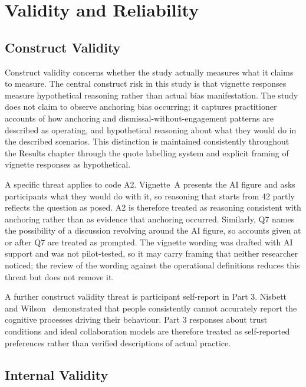 \documentclass[a4paper,twoside]{bth}
\begin{document}
\section{Validity and Reliability}
\label{sec:validity}

\subsection{Construct Validity}

Construct validity concerns whether the study actually measures what it claims to measure. The central construct risk in this study is that vignette responses measure hypothetical reasoning rather than actual bias manifestation. The study does not claim to observe anchoring bias occurring; it captures practitioner accounts of how anchoring and dismissal-without-engagement patterns are described as operating, and hypothetical reasoning about what they would do in the described scenarios. This distinction is maintained consistently throughout the Results chapter through the quote labelling system and explicit framing of vignette responses as hypothetical.

A specific threat applies to code A2. Vignette~A presents the AI figure and asks participants what they would do with it, so reasoning that starts from 42 partly reflects the question as posed. A2 is therefore treated as reasoning consistent with anchoring rather than as evidence that anchoring occurred. Similarly, Q7 names the possibility of a discussion revolving around the AI figure, so accounts given at or after Q7 are treated as prompted. The vignette wording was drafted with AI support and was not pilot-tested, so it may carry framing that neither researcher noticed; the review of the wording against the operational definitions reduces this threat but does not remove it.

A further construct validity threat is participant self-report in Part 3. Nisbett and Wilson~\cite{nisbett1977telling} demonstrated that people consistently cannot accurately report the cognitive processes driving their behaviour. Part 3 responses about trust conditions and ideal collaboration models are therefore treated as self-reported preferences rather than verified descriptions of actual practice.

\subsection{Internal Validity}
\end{document}
